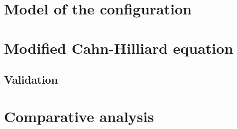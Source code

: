 \section{Model of the configuration}
\lipsum[1]
\section{Modified Cahn-Hilliard equation}
\lipsum[1]
\subsection{Validation}
\lipsum[1]
\section{Comparative analysis}
\lipsum[1]